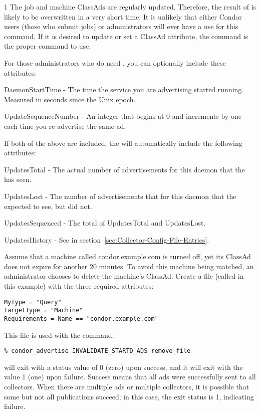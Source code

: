 \begin{ManPage}{\label{man-condor-advertise}}{1}
\GenRem
The job and machine ClassAds are regularly updated.
Therefore, the result of  is likely to be
overwritten in a very short time.
It is unlikely that either Condor users (those who submit jobs)
or administrators will ever have a use for this command.
If it is desired to update or set a ClassAd attribute, the
 command is the proper command to use.

For those administrators who do need , you can 
optionally include these attributes:

DaemonStartTime - The time the service you are advertising
started running.  Measured in seconds since the Unix epoch.

UpdateSequenceNumber - An integer that begins at 0 and increments by
one each time you re-advertise the same ad.

If both of the above are included, the  will
automatically include the following attributes:

UpdatesTotal - The actual number of advertisements for this
daemon that the  has seen.

UpdatesLost - The number of advertisements that for this daemon
that the  expected to see, but did not.

UpdatesSequenced - The total of UpdatesTotal and UpdatesLost.

UpdatesHistory - See  in
section~\ref{sec:Collector-Config-File-Entries}.

\Examples

Assume that a machine called condor.example.com is turned off,
yet its  ClassAd does not expire for another 20 minutes.
To avoid this machine being matched, an administrator chooses
to delete the machine's  ClassAd.
Create a file (called  in this example)
with the three required attributes:
\begin{verbatim}
MyType = "Query"
TargetType = "Machine"
Requirements = Name == "condor.example.com"
\end{verbatim}

This file is used with the command:
\begin{verbatim}
% condor_advertise INVALIDATE_STARTD_ADS remove_file 
\end{verbatim}

\ExitStatus

 will exit with a status value of 0 (zero) upon
success, and it will exit with the value 1 (one) upon failure.
Success means that all ads were successfully sent to all collectors.
When there are multiple ads or multiple collectors, it is possible that
some but not all publications succeed; in this case, the exit status is 1,
indicating failure.

\end{ManPage}
